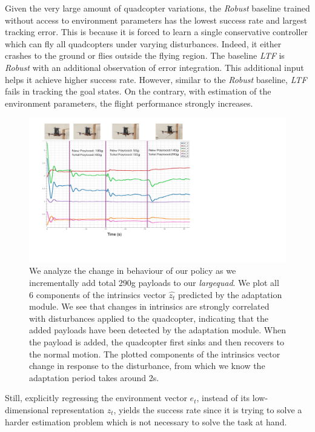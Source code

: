 Given the very large amount of quadcopter variations, the \emph{Robust} baseline trained without access to environment parameters has the lowest success rate and largest tracking error. This is because it is forced to learn a single conservative controller which can fly all quadcopters under varying disturbances.
%
Indeed, it either crashes to the ground or flies outside the flying region.
%
The baseline \emph{LTF} is \emph{Robust} with an additional observation of error integration. This additional input helps it achieve higher success rate. However, similar to the \emph{Robust} baseline, \emph{LTF} fails in tracking the goal states. 
%
On the contrary, with estimation of the environment parameters, the flight performance strongly increases.
%
\begin{figure}[t]
    \centering
    \includegraphics[width=\columnwidth]{img/extrinsics_plot_timescale.pdf}
    \caption{\small We analyze the change in behaviour of our policy as we incrementally add total 290g payloads to our \emph{largequad}. We plot all 6 components of the intrinsics vector $\hat{z_t}$ predicted by the adaptation module. We see that changes in intrinsics are strongly correlated with disturbances applied to the quadcopter, indicating that the added payloads have been detected by the adaptation module. When the payload is added, the quadcopter first sinks and then recovers to the normal motion. The plotted components of the intrinsics vector change in response to the disturbance, from which we know the adaptation period takes around 2s.}
    \label{fig:intrinsics_analysis}
\end{figure}
%
Still, explicitly regressing the environment vector $e_t$, instead of its low-dimensional representation $z_t$, yields the success rate since it is trying to solve a harder estimation problem which is not necessary to solve the task at hand.
